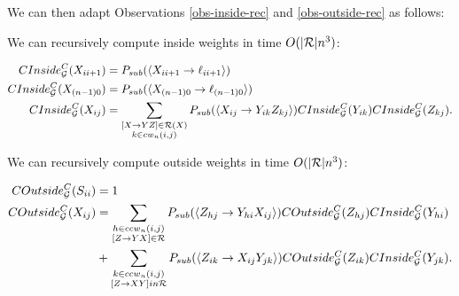 \documentclass{article}
\begin{document}
We can then adapt Observations \ref{obs-inside-rec} and \ref{obs-outside-rec} as follows:

\begin{prop}
We can recursively compute inside weights in time $O(|{\mathcal R}| n^3)$:

\begin{align*}
CInside_{{\mathcal G}}^C(X_{i i+1}) &= P_{sub} (\langle X_{ii+1} \to \ell_{i i+1}\rangle) \\
CInside_{{\mathcal G}}^C(X_{(n-1)0}) &= P_{sub} (\langle X_{(n-1)0} \to \ell_{(n-1)0}\rangle) \\
CInside_{{\mathcal G}}^C(X_{ij}) &= \sum_{\substack{[X\to YZ]\in {\mathcal R}(X)\\ k\in cw_n(i,j)}} 
P_{sub}(\langle X_{ij} \to Y_{ik} Z_{kj}\rangle) CInside_{{\mathcal G}}^C(Y_{ik}) CInside_{{\mathcal G}}^C(Z_{kj}).
\end{align*}
\end{prop}

\begin{prop}
We can recursively compute outside weights in time $O(|{\mathcal R}| n^3)$:

\begin{align*}
COutside_{{\mathcal G}}^C(S_{ii}) &= 1\\
COutside_{{\mathcal G}}^C(X_{ij}) &=
\sum_{\substack{h\in ccw_n(i,j) \\ [Z\to YX] \in {\mathcal R}}} P_{sub}(\langle Z_{hj} \to Y_{hi} X_{ij} \rangle)
COutside_{{\mathcal G}}^C(Z_{hj}) CInside_{{\mathcal G}}^C(Y_{hi})\\
&+ \sum_{\substack{k \in ccw_n(i,j)\\ [Z\to XY] in {\mathcal R}}}
P_{sub}(\langle Z_{ik} \to X_{ij} Y_{jk} \rangle)
COutside_{{\mathcal G}}^C(Z_{ik}) CInside_{{\mathcal G}}^C(Y_{jk}).
\end{align*}
\end{prop}



\end{document}
